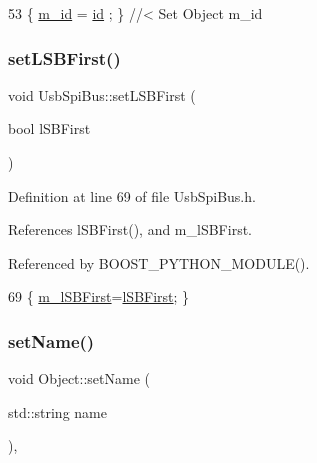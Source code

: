 \begin{DoxyCode}
53 \{ \hyperlink{classObject_aca74b9dbfed7b5556ea2d56c65b6b6b0}{m\_id}    = \hyperlink{classObject_af99145335cc61ff6e2798ea17db009d2}{id}    ; \} \textcolor{comment}{//< Set Object m\_id}
\end{DoxyCode}
\mbox{\label{classUsbSpiBus_ab601d59e0b5110c2275c1cc298664e27}} 
\subsubsection{\texorpdfstring{set\+L\+S\+B\+First()}{setLSBFirst()}}
{\footnotesize\ttfamily void Usb\+Spi\+Bus\+::set\+L\+S\+B\+First (\begin{DoxyParamCaption}\item[{bool}]{l\+S\+B\+First }\end{DoxyParamCaption})\hspace{0.3cm}{\ttfamily [inline]}}



Definition at line 69 of file Usb\+Spi\+Bus.\+h.



References l\+S\+B\+First(), and m\+\_\+l\+S\+B\+First.



Referenced by B\+O\+O\+S\+T\+\_\+\+P\+Y\+T\+H\+O\+N\+\_\+\+M\+O\+D\+U\+L\+E().


\begin{DoxyCode}
69 \{ \hyperlink{classUsbSpiBus_a23011787b0425356b011bc7a1c7cff5b}{m\_lSBFirst}=\hyperlink{classUsbSpiBus_af6af49c1ac52cc0586570c1f43d0bc25}{lSBFirst}; \}
\end{DoxyCode}
\mbox{\label{classObject_ae30fea75683c2d149b6b6d17c09ecd0c}} 
\subsubsection{\texorpdfstring{set\+Name()}{setName()}}
{\footnotesize\ttfamily void Object\+::set\+Name (\begin{DoxyParamCaption}\item[{std\+::string}]{name }\end{DoxyParamCaption})\hspace{0.3cm}{\ttfamily [inline]}, {\ttfamily [inherited]}}



